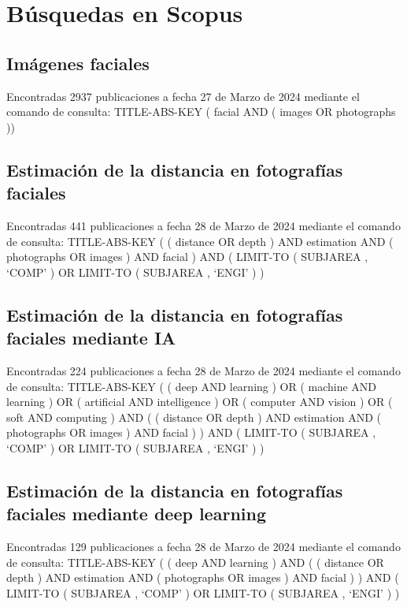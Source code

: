 \thispagestyle{empty}
\section*{Búsquedas en Scopus}\label{scopus}

\subsection*{Imágenes faciales}

Encontradas 2937 publicaciones a fecha 27 de Marzo de 2024 mediante el comando de consulta:
TITLE-ABS-KEY ( facial AND ( images OR photographs ))

\subsection*{Estimación de la distancia en fotografías faciales}

Encontradas 441 publicaciones a fecha 28 de Marzo de 2024 mediante el comando de consulta: 	
TITLE-ABS-KEY ( ( distance OR depth ) AND estimation AND ( photographs OR images ) AND facial ) AND ( LIMIT-TO ( SUBJAREA , \enquote*{COMP} ) OR LIMIT-TO ( SUBJAREA , \enquote*{ENGI} ) )

\subsection*{Estimación de la distancia en fotografías faciales mediante IA}

Encontradas 224 publicaciones a fecha 28 de Marzo de 2024 mediante el comando de consulta:
TITLE-ABS-KEY ( ( deep AND learning ) OR ( machine AND learning ) OR ( artificial AND intelligence ) OR ( computer AND vision ) OR ( soft AND computing ) AND ( ( distance OR depth ) AND estimation AND ( photographs OR images ) AND facial ) ) AND ( LIMIT-TO ( SUBJAREA , \enquote*{COMP} ) OR LIMIT-TO ( SUBJAREA , \enquote*{ENGI} ) )

\subsection*{Estimación de la distancia en fotografías faciales mediante deep learning}

Encontradas 129 publicaciones a fecha 28 de Marzo de 2024 mediante el comando de consulta:
TITLE-ABS-KEY ( ( deep AND learning ) AND ( ( distance OR depth ) AND estimation AND ( photographs OR images ) AND facial ) ) AND ( LIMIT-TO ( SUBJAREA , \enquote*{COMP} ) OR LIMIT-TO ( SUBJAREA , \enquote*{ENGI} ) )
	